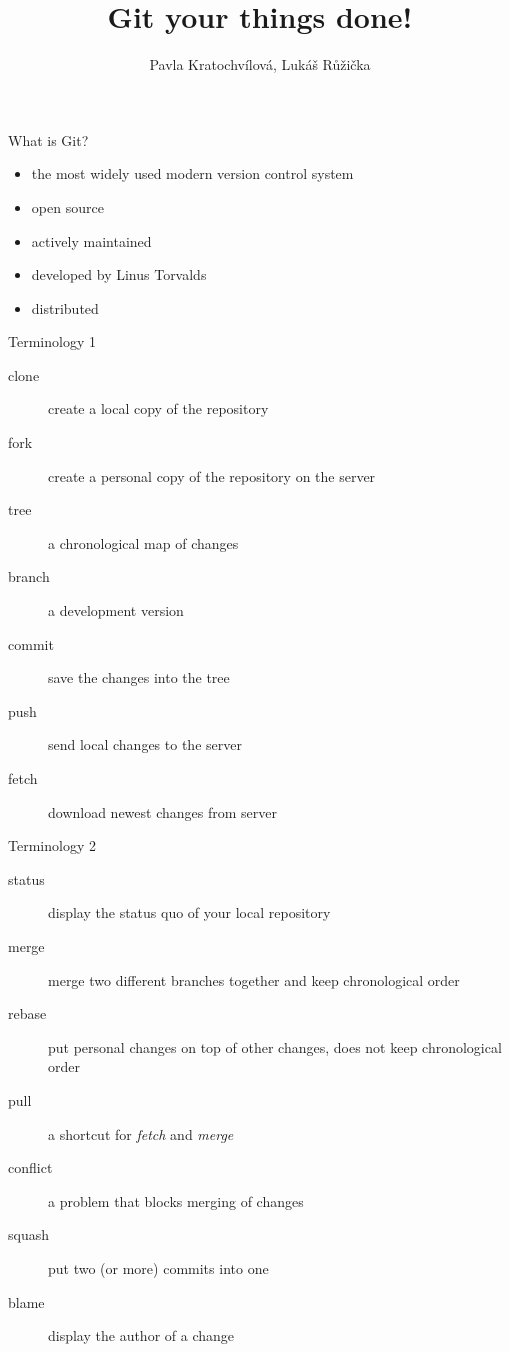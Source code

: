 \documentclass[14pt]{beamer}
\begin{document}
	\author{Pavla Kratochvílová, Lukáš Růžička}
	\title{Git your things done!}
	\begin{frame}[plain]
		\maketitle
	\end{frame}
	
	\begin{frame}{What is Git?}
		\begin{itemize}
		\item the most widely used modern version control system
		\item open source
		\item actively maintained
		\item developed by Linus Torvalds
		\item distributed 
		\end{itemize}
	\end{frame}

	\begin{frame}{Terminology 1}
	\begin{description}
		\item[clone] create a local copy of the repository
		\item[fork] create a personal copy of the repository on the server 
		\item[tree] a chronological map of changes
		\item[branch] a development version
		\item[commit] save the changes into the tree
		\item[push] send local changes to the server
		\item[fetch] download newest changes from server
	\end{description}
	\end{frame}

	\begin{frame}{Terminology 2}
	\begin{description}
		\item[status] display the status quo of your local repository
		\item[merge] merge two different branches together and keep chronological order
		\item[rebase] put personal changes on top of other changes, does not keep chronological order
		\item[pull] a shortcut for \textit{fetch} and \textit{merge}
		\item[conflict] a problem that blocks merging of changes
		\item[squash] put two (or more) commits into one
		\item[blame] display the author of a change
	\end{description}
	\end{frame}
\end{document}
